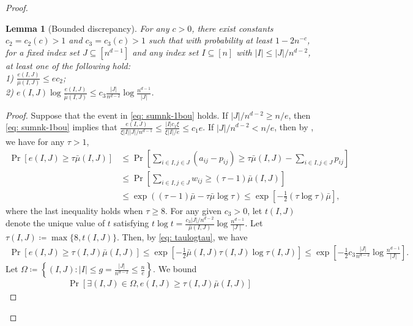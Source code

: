 \documentclass{article}
\theoremstyle{plain}
\newtheorem{lemma}[theorem]{Lemma}
\theoremstyle{definition}
\theoremstyle{remark}
\begin{document}
\begin{appendix}
\begin{center}
\begin{proof}
			\begin{lemma}[Bounded discrepancy]\label{lem: boudis}
				For any $c>0$, there exist constants $c_2=c_2(c) >1$ and $c_3=c_3(c)>1$ such that with probability at least $1-2 n^{-c}$, for a fixed index set $J\subseteq [n^{d-1}]$ and any index set $I\subseteq [n]$ with $|I| \leq|J|/n^{d-2}$, at least one of the following hold:\\
				1) $\frac{e(I, J)}{\bar{\mu}(I, J)} \leq e c_2$;\\
				2) $e(I, J) \log \frac{e(I, J)}{\bar{\mu}(I, J)} \leq c_3\frac{|J|}{n^{d-2}} \log \frac{n^{d-1}}{|J|}$.
			\end{lemma}
			\begin{proof}
				Suppose that the event in \eqref{eq: sumnk-1bou} holds. If $|J|/n^{d-2} \geq n / e$, then \eqref{eq: sumnk-1bou} implies that $\frac{e(I, J)}{\xi|I||J| / n^{d-1}} \leq \frac{|I| c_1 \xi}{\xi|I| / e} \leq c_1 e$. If $|J|/n^{d-2}<n / e$, then by \citet[Lemma 4.5]{zhou2021sparse}, we have for any $\tau >1$,
				\begin{align}
					\operatorname{Pr}[e(I, J) \geq \tau \bar{\mu}(I, J)] & \leq \operatorname{Pr}\left[\sum_{i\in I, j\in J}\left(a_{i j}-p_{i j}\right) \geq \tau \bar{\mu}(I, J)-\sum_{i\in I, j\in J} p_{i j}\right] \nonumber \\
					& \leq \operatorname{Pr}\left[\sum_{i\in I, j\in J} w_{i j} \geq(\tau-1) \bar{\mu}(I, J)\right]  \nonumber \\
					& \leq \exp \left((\tau-1) \bar{\mu}-\tau \bar{\mu} \log \tau \right) \leq \exp \left[-\frac{1}{2}(\tau \log \tau) \bar{\mu}\right], \label{eq: taulogtau}
				\end{align}
				where the last inequality holds when $\tau \geq 8$.
				For any given $c_3>0$, let $t(I, J)$ denote the unique value of $t$ satisfying $t \log t=\frac{c_3|J|/n^{d-2}}{\bar{\mu}(I, J)} \log \frac{n^{d-1}}{\mid J \mid}$. Let $\tau(I, J)\coloneqq\max \{8, t(I, J)\}$. Then, by \eqref{eq: taulogtau}, we have
				\begin{align*}
						\operatorname{Pr}[e(I, J) \geq \tau(I, J) \bar{\mu}(I, J)] \leq \exp \left[-\frac{1}{2} \bar{\mu}(I, J) \tau(I, J) \log \tau(I, J)\right]
						\leq \exp \left[-\frac{1}{2} c_3\frac{|J|}{n^{d-2}} \log \frac{n^{d-1}}{|J|}\right].
				\end{align*}
				Let $\Omega \coloneqq \left\{(I,J): |I| \leq g =  \frac{|J|}{n^{d-2}} \leq \frac{n}{e} \right\}$. We bound
				\begin{align*}
					\operatorname{Pr}\left[\exists(I, J)\in \Omega, e(I, J) \geq \tau(I, J) \bar{\mu}(I, J)\right] 

\end{align*}
\end{proof}
\end{proof}
\end{center}
\end{appendix}
\end{document}

